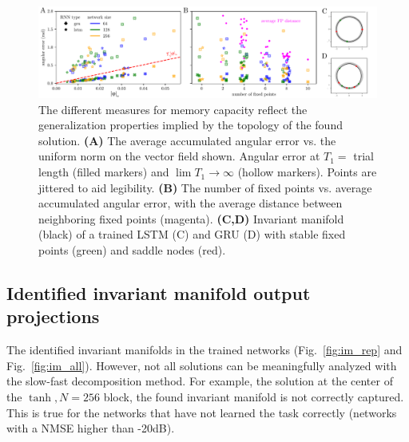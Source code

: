 \documentclass{article} %
\newcounter{ct}
\theoremstyle{definition}
\theoremstyle{remark}
\begin{document}
\begin{figure}[tbhp]
  \centering
  \includegraphics[width=\textwidth]{angular_losses_lstm_gru}
  \caption{%
      The different measures for memory capacity reflect the generalization properties implied by the topology of the found solution.
    \textbf{(A)} The average accumulated angular error vs. the uniform norm on the vector field shown.
     Angular error at \(T_{1} =\) trial length (filled markers) and \(\lim T_{1} \to \infty\)  (hollow markers).
      Points are jittered to aid legibility.
    \textbf{(B)} The number of fixed points vs. average accumulated angular error, with the average distance between neighboring fixed points (magenta).
    \textbf{(C,D)} Invariant manifold (black) of a trained LSTM (C) and GRU (D) with stable fixed points (green) and saddle nodes (red).
}\label{fig:angular_losses_lstm_gru}
\end{figure}



\newpage
 \subsection{Identified invariant manifold output projections}\label{sec:inv_man_projections}
 The identified invariant manifolds in the trained networks (Fig.~\ref{fig:im_rep} and Fig.~\ref{fig:im_all}).
 However, not all solutions can be meaningfully analyzed with the slow-fast decomposition method.
 For example, the solution at the center of the \(\tanh, N = 256\) block, the found invariant manifold is not correctly captured.
 This is true for the networks that have not learned the task correctly (networks with a NMSE higher than -20dB).
\end{document}
